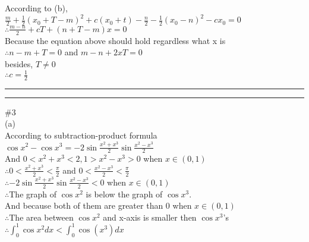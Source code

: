 \documentclass{article}
\begin{document}
According to (b),\\

$\displaystyle\frac{m}{2}+\frac{1}{2}(x_0+T-m)^2+c(x_0+t)-\frac{n}{2}-\frac{1}{2}(x_0-n)^2-cx_0=0$\\

$\therefore$\qquad$\displaystyle\frac{m-n}{2}+cT+(n+T-m)x=0$\\

Because the equation above should hold regardless what x is\\

$\therefore$\qquad$n-m+T=0$ and $m-n+2xT=0$\\

\qquad\quad besides, $T\neq0$\\

$\therefore$\qquad$c=\displaystyle\frac{1}{2}$\\

\hrule
\vskip 1mm
\hrule
\vskip 0.5cm

\textcolor[rgb]{0.00,0.00,0.50}{\#3}\\

(a)\\

According to subtraction-product formula\\

$\displaystyle\cos{x^2}-\cos{x^3}=-2\sin{\displaystyle\frac{x^2+x^3}{2}}\sin{\displaystyle\frac{x^2-x^3}{2}}$\\

And $0<x^2+x^3<2, 1>x^2-x^3>0$ when $x\in(0,1)$\\

$\therefore$\qquad$0<\displaystyle\frac{x^2+x^3}{2}<\frac{\pi}{2}$ and $0<\displaystyle\frac{x^2-x^3}{2}<\frac{\pi}{2}$\\

$\therefore$\qquad$\displaystyle-2\sin{\displaystyle\frac{x^2+x^3}{2}}\sin{\displaystyle\frac{x^2-x^3}{2}}<0$ when $x\in(0,1)$\\

$\therefore$\qquad The graph of $\cos{x^2}$ is below the graph of $\cos{x^3}$.\\

\qquad\quad And because both of them are greater than 0 when $x\in(0,1)$\\

$\therefore$\qquad The area between $\cos{x^2}$ and x-axis is smaller then $\cos{x^3}$'s\\

$\therefore$\qquad$\displaystyle\int_{0}^{1}\cos{x^2}dx<\int_{0}^{1}\cos(x^3)dx$\\
\end{document}

